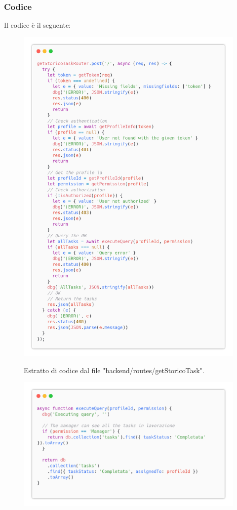 \documentclass{report}
\begin{document}
\subsubsection*{Codice}

Il codice è il seguente:
\begin{figure}[H]
	\centering\includegraphics[width=1\textwidth]{images/code_storico.png}
	
	Estratto di codice dal file "backend/routes/getStoricoTask".
\end{figure}
\begin{figure}[H]
	\centering\includegraphics[width=1\textwidth]{images/code_storico2.png}
\end{figure}
\end{document}
